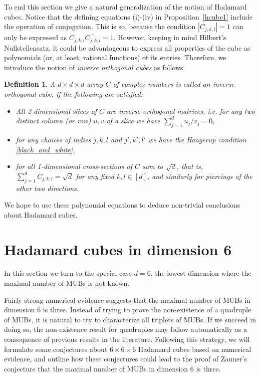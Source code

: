 \documentclass[12pt]{amsart}
\numberwithin{equation}{section}
\newtheorem{defi}[fact]{Definition}
\newenvironment{definition}{\begin{defi} \rm}{\end{defi}}
\theoremstyle{definition}
\theoremstyle{remark}
\theoremstyle{remark}
\begin{document}
To end this section we give a natural generalization of the notion of Hadamard cubes. Notice that the defining equations (i)-(iv) in Proposition~\ref{hcube1} include the operation of conjugation. This is so, because the condition $|C_{j,k,l}|=1$ can only be expressed as $C_{j,k,l}\overline{C_{j,k,l}}=1$. However, keeping in mind Hilbert's Nullstellensatz, it could be advantageous to express all properties of the cube as polynomials (or, at least, rational functions)  of its entries. Therefore, we introduce the notion of {\it inverse orthogonal cubes} as follows. 

\begin{definition}\label{io}
A $d\times d\times d$ array $C$ of complex numbers is called an {\it inverse orthogonal cube}, if the following are satisfied: 
\begin{itemize}
 \item[a)] All 2-dimensional slices of $C$ are inverse-orthogonal matrices, i.e. for any two distinct column (or row) $u, v$ of a slice we have $\sum_{j=1}^d u_j/v_j=0$,
\item[b)] for any choices of indies $j, k, l$ and $j', k', l'$ we have the Haagerup condition \eqref{black_and_white},
\item[c)] for all 1-dimensional cross-sections of $C$ sum to $\sqrt{d}$, that is, $\sum_{j=1}^d C_{j,k,l}=\sqrt{d}$ for any fixed $k,l\in[d]$, and similarly for piercings of the other two directions.
\end{itemize}
\end{definition}

\medskip

We hope to use these polynomial equations to deduce non-trivial conclusions about Hadamard cubes.  

\section{Hadamard cubes in dimension 6}\label{sec4}

In this section we turn to the special case $d=6$, the lowest dimension where the maximal number of MUBs is not known. 

\medskip

Fairly strong numerical evidence suggests that the maximal number of MUBs in dimension 6 is three. Instead of trying to prove the non-existence of a quadruple of MUBs, it is natural to try to characterize all triplets of MUBs. If we succeed in doing so, the non-existence result for quadruples may follow automatically as a consequence of previous results in the literature. Following this strategy, we will formulate some conjectures about $6\times 6\times 6$  Hadamard cubes based on numerical evidence, and outline how these conjectures could lead to the proof of Zauner's conjecture that the maximal number of MUBs in dimension 6 is three.
\end{document}
